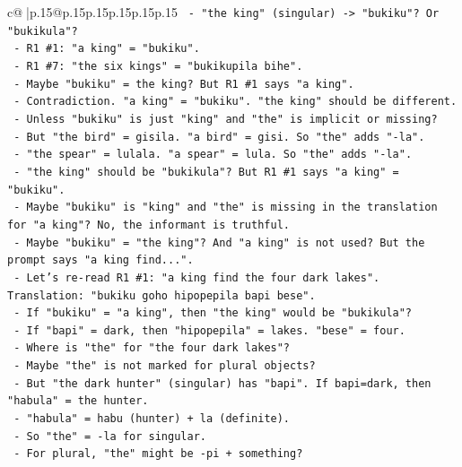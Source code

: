 \documentclass{article}
\begin{document}
{\begin{supertabular}{c@{$\;$}|p{.15\linewidth}@{}p{.15\linewidth}p{.15\linewidth}p{.15\linewidth}p{.15\linewidth}p{.15\linewidth}}
{{{\texttt{                  {-} "the king" (singular) {-}> "bukiku"? Or "bukikula"?} \\
\texttt{                  {-} R1 \#1: "a king" = "bukiku".} \\
\texttt{                  {-} R1 \#7: "the six kings" = "bukikupila bihe".} \\
\texttt{                  {-} Maybe "bukiku" = the king? But R1 \#1 says "a king".} \\
\texttt{                  {-} Contradiction. "a king" = "bukiku". "the king" should be different.} \\
\texttt{                  {-} Unless "bukiku" is just "king" and "the" is implicit or missing?} \\
\texttt{                  {-} But "the bird" = gisila. "a bird" = gisi. So "the" adds "{-}la".} \\
\texttt{                  {-} "the spear" = lulala. "a spear" = lula. So "the" adds "{-}la".} \\
\texttt{                  {-} "the king" should be "bukikula"? But R1 \#1 says "a king" = "bukiku".} \\
\texttt{                  {-} Maybe "bukiku" is "king" and "the" is missing in the translation for "a king"? No, the informant is truthful.} \\
\texttt{                  {-} Maybe "bukiku" = "the king"? And "a king" is not used? But the prompt says "a king find...".} \\
\texttt{                  {-} Let's re{-}read R1 \#1: "a king find the four dark lakes". Translation: "bukiku goho hipopepila bapi bese".} \\
\texttt{                  {-} If "bukiku" = "a king", then "the king" would be "bukikula"?} \\
\texttt{                  {-} If "bapi" = dark, then "hipopepila" = lakes. "bese" = four.} \\
\texttt{                  {-} Where is "the" for "the four dark lakes"?} \\
\texttt{                  {-} Maybe "the" is not marked for plural objects?} \\
\texttt{                  {-} But "the dark hunter" (singular) has "bapi". If bapi=dark, then "habula" = the hunter.} \\
\texttt{                  {-} "habula" = habu (hunter) + la (definite).} \\
\texttt{                  {-} So "the" = {-}la for singular.} \\
\texttt{                  {-} For plural, "the" might be {-}pi + something?} \\
}}}
\end{supertabular}}
\end{document}
